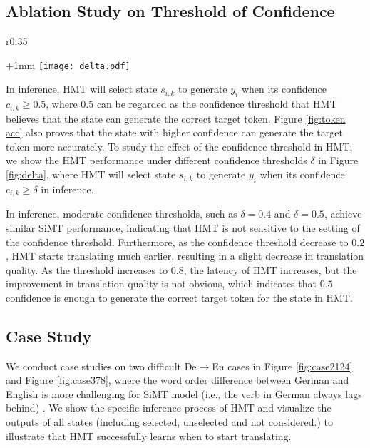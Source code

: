 \documentclass{article} %
\begin{document}
\subsection{Ablation Study on Threshold of Confidence}

\setlength{\columnsep}{12pt}
\begin{wrapfigure}{r}{0.35\textwidth}
\begin{center}
\advance\leftskip+1mm
  \vspace{-0.25in} 
 \texttt{[image: delta.pdf]}
   \vspace{-0.1in} 
  \caption{HMT performance under various thresholds $\delta$ of confidence.}\label{fig:delta}
\vspace{-0.3in} 
\end{center}
\end{wrapfigure}
In inference, HMT will select state $s_{i,k}$ to generate $y_{i}$ when its confidence $c_{i,k}\geq0.5$, where $0.5$ can be regarded as the confidence threshold that HMT believes that the state can generate the correct target token. Figure \ref{fig:token acc} also proves that the state with higher confidence can generate the target token more accurately. To study the effect of the confidence threshold in HMT, we show the HMT performance under different confidence thresholds $\delta$ in Figure \ref{fig:delta}, where HMT will select state $s_{i,k}$ to generate $y_{i}$ when its confidence $c_{i,k}\geq \delta$ in inference.

In inference, moderate confidence thresholds, such as $\delta\!=\!0.4$ and $\delta\!=\!0.5$, achieve similar SiMT performance, indicating that HMT is not sensitive to the setting of the confidence threshold. Furthermore, as the confidence threshold decrease to $0.2$, HMT starts translating much earlier, resulting in a slight decrease in translation quality. As the threshold increases to $0.8$, the latency of HMT increases, but the improvement in translation quality is not obvious, which indicates that $0.5$ confidence is enough to generate the correct target token for the state in HMT.




\subsection{Case Study}


We conduct case studies on two difficult De$\rightarrow$En cases in Figure \ref{fig:case2124} and Figure \ref{fig:case378}, where the word order difference between German and English is more challenging for SiMT model (i.e., the verb in German always lags behind) \citep{ma-etal-2019-stacl,zhang-feng-2021-universal}. We show the specific inference process of HMT and visualize the outputs of all states (including selected, unselected and not considered.) to illustrate that HMT successfully learns when to start translating.
\end{document}
